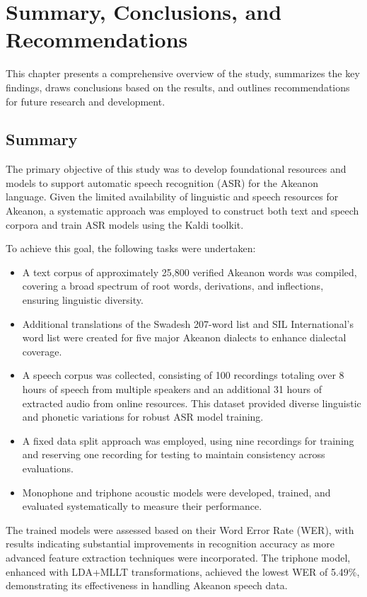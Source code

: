 \chapter{Summary, Conclusions, and Recommendations}

This chapter presents a comprehensive overview of the study, summarizes the key findings, draws conclusions based on the results, and outlines recommendations for future research and development.

\section{Summary}

The primary objective of this study was to develop foundational resources and models to support automatic speech recognition (ASR) for the Akeanon language. Given the limited availability of linguistic and speech resources for Akeanon, a systematic approach was employed to construct both text and speech corpora and train ASR models using the Kaldi toolkit.

To achieve this goal, the following tasks were undertaken:

\begin{itemize} \item A text corpus of approximately 25,800 verified Akeanon words was compiled, covering a broad spectrum of root words, derivations, and inflections, ensuring linguistic diversity. \item Additional translations of the Swadesh 207-word list and SIL International’s word list were created for five major Akeanon dialects to enhance dialectal coverage. \item A speech corpus was collected, consisting of 100 recordings totaling over 8 hours of speech from multiple speakers and an additional 31 hours of extracted audio from online resources. This dataset provided diverse linguistic and phonetic variations for robust ASR model training. \item A fixed data split approach was employed, using nine recordings for training and reserving one recording for testing to maintain consistency across evaluations. \item Monophone and triphone acoustic models were developed, trained, and evaluated systematically to measure their performance. \end{itemize}

The trained models were assessed based on their Word Error Rate (WER), with results indicating substantial improvements in recognition accuracy as more advanced feature extraction techniques were incorporated. The triphone model, enhanced with LDA+MLLT transformations, achieved the lowest WER of 5.49\%, demonstrating its effectiveness in handling Akeanon speech data.

